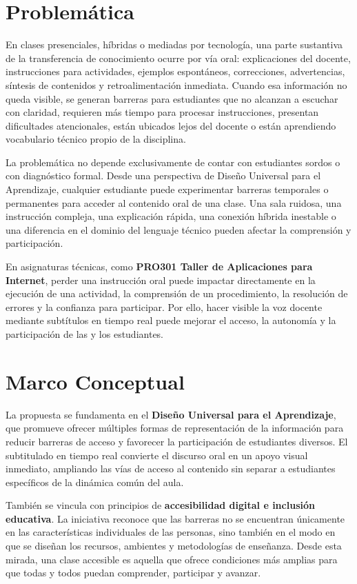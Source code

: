 \documentclass[11pt,letterpaper]{article}
\begin{document}
\section{Problemática}

En clases presenciales, híbridas o mediadas por tecnología, una parte sustantiva de la transferencia de conocimiento ocurre por vía oral: explicaciones del docente, instrucciones para actividades, ejemplos espontáneos, correcciones, advertencias, síntesis de contenidos y retroalimentación inmediata. Cuando esa información no queda visible, se generan barreras para estudiantes que no alcanzan a escuchar con claridad, requieren más tiempo para procesar instrucciones, presentan dificultades atencionales, están ubicados lejos del docente o están aprendiendo vocabulario técnico propio de la disciplina.

La problemática no depende exclusivamente de contar con estudiantes sordos o con diagnóstico formal. Desde una perspectiva de Diseño Universal para el Aprendizaje, cualquier estudiante puede experimentar barreras temporales o permanentes para acceder al contenido oral de una clase. Una sala ruidosa, una instrucción compleja, una explicación rápida, una conexión híbrida inestable o una diferencia en el dominio del lenguaje técnico pueden afectar la comprensión y participación.

En asignaturas técnicas, como \textbf{PRO301 Taller de Aplicaciones para Internet}, perder una instrucción oral puede impactar directamente en la ejecución de una actividad, la comprensión de un procedimiento, la resolución de errores y la confianza para participar. Por ello, hacer visible la voz docente mediante subtítulos en tiempo real puede mejorar el acceso, la autonomía y la participación de las y los estudiantes.

\section{Marco Conceptual}

La propuesta se fundamenta en el \textbf{Diseño Universal para el Aprendizaje}, que promueve ofrecer múltiples formas de representación de la información para reducir barreras de acceso y favorecer la participación de estudiantes diversos. El subtitulado en tiempo real convierte el discurso oral en un apoyo visual inmediato, ampliando las vías de acceso al contenido sin separar a estudiantes específicos de la dinámica común del aula.

También se vincula con principios de \textbf{accesibilidad digital e inclusión educativa}. La iniciativa reconoce que las barreras no se encuentran únicamente en las características individuales de las personas, sino también en el modo en que se diseñan los recursos, ambientes y metodologías de enseñanza. Desde esta mirada, una clase accesible es aquella que ofrece condiciones más amplias para que todas y todos puedan comprender, participar y avanzar.
\end{document}
